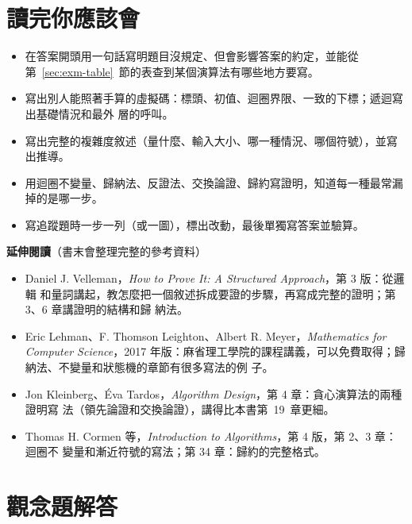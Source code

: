 \section{讀完你應該會}
\label{sec:exm-checklist}

\begin{itemize}
\item 在答案開頭用一句話寫明題目沒規定、但會影響答案的約定，並能從
第~\ref{sec:exm-table}~節的表查到某個演算法有哪些地方要寫。
\item 寫出別人能照著手算的虛擬碼：標頭、初值、迴圈界限、一致的下標；遞迴寫出基礎情況和最外
層的呼叫。
\item 寫出完整的複雜度敘述（量什麼、輸入大小、哪一種情況、哪個符號），並寫出推導。
\item 用迴圈不變量、歸納法、反證法、交換論證、歸約寫證明，知道每一種最常漏掉的是哪一步。
\item 寫追蹤題時一步一列（或一圖），標出改動，最後單獨寫答案並驗算。
\end{itemize}

\textbf{延伸閱讀}（書末會整理完整的參考資料）

\begin{itemize}
\item Daniel J. Velleman，\textit{How to Prove It: A Structured Approach}，第 3 版：從邏輯
和量詞講起，教怎麼把一個敘述拆成要證的步驟，再寫成完整的證明；第 3、6 章講證明的結構和歸
納法。
\item Eric Lehman、F. Thomson Leighton、Albert R. Meyer，\textit{Mathematics for Computer
Science}，2017 年版：麻省理工學院的課程講義，可以免費取得；歸納法、不變量和狀態機的章節有很多寫法的例
子。
\item Jon Kleinberg、Éva Tardos，\textit{Algorithm Design}，第 4 章：貪心演算法的兩種證明寫
法（領先論證和交換論證），講得比本書第~19~章更細。
\item Thomas H. Cormen 等，\textit{Introduction to Algorithms}，第 4 版，第 2、3 章：迴圈不
變量和漸近符號的寫法；第 34 章：歸約的完整格式。
\end{itemize}

\section*{觀念題解答}

